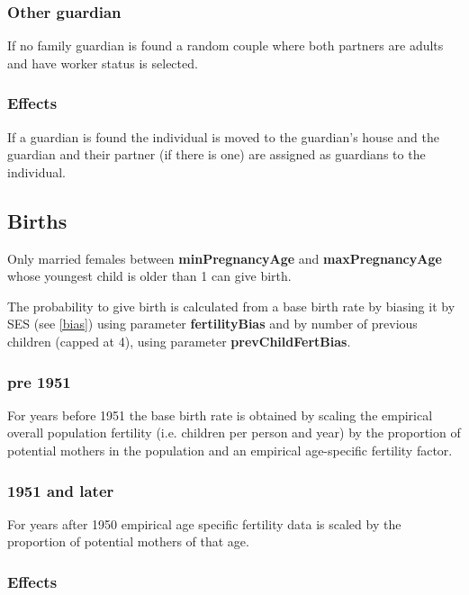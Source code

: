 \documentclass{article}
\newcommand{\marginnote}[1]{\protect\marginpar{\small\texttt{#1}}}
\begin{document}
\subsubsection*{Other guardian}

If no family guardian is found a random couple where both partners are adults and have worker status is selected.

\subsubsection*{Effects}

If a guardian is found the individual is moved to the guardian's house and the guardian and their partner (if there is one) are assigned as guardians to the individual.


\subsection{Births \marginnote{Births.jl}}

Only married females between \textbf{minPregnancyAge} and \textbf{maxPregnancyAge} whose youngest child is older than 1 can give birth.

The probability to give birth is calculated from a base birth rate by biasing it by SES (see \ref{bias}) using parameter \textbf{fertilityBias} and by number of previous children (capped at 4), using parameter \textbf{prevChildFertBias}.

\subsubsection*{pre 1951}

For years before 1951 the base birth rate is obtained by scaling the empirical overall population fertility (i.e. children per person and year) by the proportion of potential mothers in the population and an empirical age-specific fertility factor.

\subsubsection*{1951 and later}

For years after 1950 empirical age specific fertility data is scaled by the proportion of potential mothers of that age.

\subsubsection*{Effects}
\end{document}
